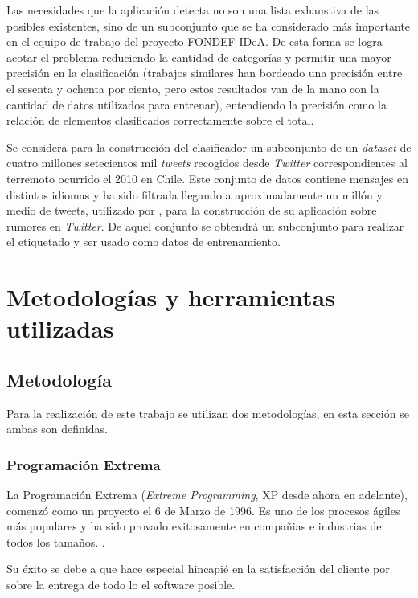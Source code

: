 Las necesidades que la aplicación detecta no son una lista exhaustiva de las posibles existentes, sino de un subconjunto que se ha considerado más importante en el equipo de trabajo del proyecto FONDEF IDeA. De esta forma se logra acotar el problema reduciendo la cantidad de categorías y permitir una mayor precisión en la clasificación (trabajos similares han bordeado una precisión entre el sesenta y ochenta por ciento, pero estos resultados van de la mano con la cantidad de datos utilizados para entrenar), entendiendo la precisión como la relación de elementos clasificados correctamente sobre el total.

Se considera para la construcción del clasificador un subconjunto de un \textit{dataset} de cuatro millones setecientos mil \textit{tweets} recogidos desde \textit{Twitter} correspondientes al terremoto ocurrido el 2010 en Chile. Este conjunto de datos contiene mensajes en distintos idiomas y ha sido filtrada llegando a aproximadamente un millón y medio de tweets, utilizado por \cite{}, para la construcción de su aplicación sobre rumores en \textit{Twitter}. De aquel conjunto se obtendrá un subconjunto para realizar el etiquetado y ser usado como datos de entrenamiento. 

\section{Metodologías y herramientas utilizadas}
\label{intro:metodologia}

\subsection{Metodología}
\label{subsec:MetodologiaDetalle}

Para la realización de este trabajo se utilizan dos metodologías, en esta sección se ambas son definidas.

\subsubsection*{Programación Extrema}
\label{subsubsec:XP}

La Programación Extrema (\textit{Extreme Programming}, XP desde ahora en adelante), comenzó como un proyecto el 6 de Marzo de 1996. Es uno de los procesos ágiles más populares y ha sido provado exitosamente en compañias e industrias de todos los tamaños. \cite{xP}.

Su éxito se debe a que hace especial hincapié en la satisfacción del cliente por sobre la entrega de todo lo el software posible.

